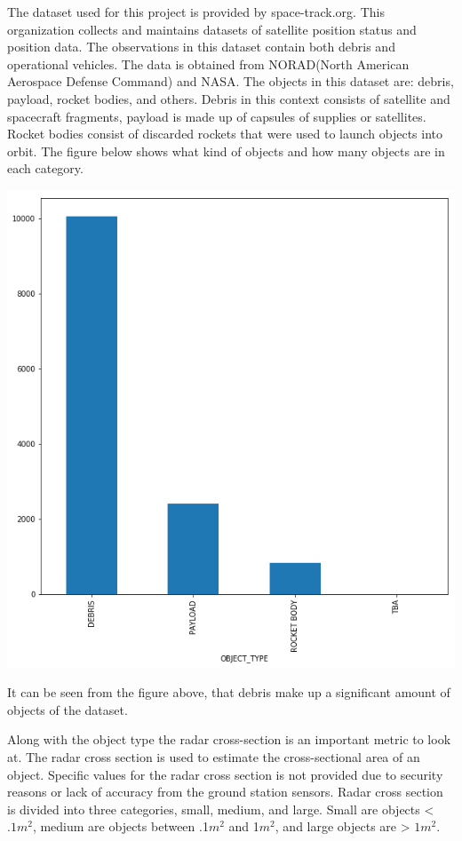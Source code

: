 \documentclass[12pt,a4paper]{article}
\begin{document}
The dataset used for this project is provided by space-track.org. This organization collects and maintains datasets of satellite position status and position data. The observations in this dataset contain both debris and operational vehicles. The data is obtained from NORAD(North American Aerospace Defense Command) and NASA. The objects in this dataset are: debris, payload, rocket bodies, and others. Debris in this context consists of satellite and spacecraft fragments, payload is made up of capsules of supplies or satellites. Rocket bodies consist of discarded rockets that were used to launch objects into orbit. The figure below shows what kind of objects and how many objects are in each category.
\begin{center}
	\includegraphics[scale=0.25]{figures/object_types.png}
	\label{fig:object_types}
\end{center}
It can be seen from the figure above, that debris make up a significant amount of objects of the dataset. 

Along with the object type the radar cross-section is an important metric to look at. The radar cross section is used to estimate the cross-sectional area of an object. Specific values for the radar cross section is not provided due to security reasons or lack of accuracy from the ground station sensors. Radar cross section is divided into three categories, small, medium, and large. Small are objects <$.1 m^2$, medium are objects between .1$m^2$ and 1$m^2$, and large objects are > $1m^2$\cite{spaceTrack}.
\end{document}
